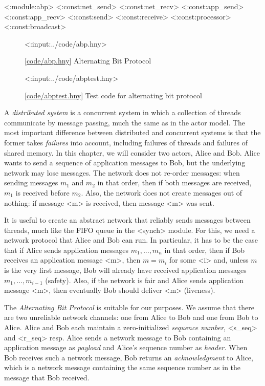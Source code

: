 \documentclass{report}
\newcommand{\harmonylink}[1]{%
[\href{https://harmony.cs.cornell.edu/#1}{\underline{#1}}]%
}
\newenvironment{code}{
\tcolorbox
}{
\endtcolorbox
}
\begin{document}
<{:module:abp}>
<{:const:net_send}>
<{:const:net_recv}>
<{:const:app_send}>
<{:const:app_recv}>
<{:const:send}>
<{:const:receive}>
<{:const:processor}>
<{:const:broadcast}>

\begin{figure}
\begin{code}
<{:input:../code/abp.hny}>
\end{code}
\caption{\harmonylink{code/abp.hny} Alternating Bit Protocol}
\label{fig:abp}
\end{figure}

\begin{figure}
\begin{code}
<{:input:../code/abptest.hny}>
\end{code}
\caption{\harmonylink{code/abptest.hny} Test code for alternating bit protocol}
\label{fig:abptest}
\end{figure}

A
\emph{distributed system}
%
is a concurrent system in which a collection
of threads communicate by message passing, much the same as
in the actor model.
The most important difference between distributed and concurrent
systems is that the former takes \emph{failures}
%
into account,
including failures of threads and failures of shared memory.
In this chapter, we will consider two actors, Alice and Bob.
Alice wants to send a sequence of application messages to Bob,
but the underlying network may lose messages.
%
The network does not re-order messages: when sending messages
$m_1$ and $m_2$ in that order, then if both messages are received,
$m_1$ is received before $m_2$.
Also, the network does not create messages out of nothing: if
message <{m}> is received, then message <{m}> was sent.

It is useful to create an abstract network that reliably sends messages
between threads, much like the FIFO queue in the <{synch}> module.
For this, we need a network protocol that Alice and Bob can run.
In particular, it has to be the case that if Alice sends application
messages $m_1, ..., m_n$ in that order, then if Bob receives an
application message
<{m}>, then $m = m_i$ for some <{i}> and, unless $m$ is the very first
message, Bob will already have received
application messages $m_1, ..., m_{i-1}$ (safety).
Also, if the network is fair and Alice sends application message
<{m}>, then eventually Bob should deliver <{m}> (liveness).

The \emph{Alternating Bit Protocol} is suitable for our purposes.
We assume that there are two unreliable network channels: one from Alice
to Bob and one from Bob to Alice.
Alice and Bob each maintain a zero-initialized
\emph{sequence number},
%
<{s_seq}> and <{r_seq}> resp.
Alice sends a network message to Bob containing an
application message as \emph{payload} and Alice's sequence number
as \emph{header}.
When Bob receives such a network message, Bob returns an
\emph{acknowledgment}
%
to Alice, which is a network message
containing the same sequence number as in the message that Bob received.
\end{document}
